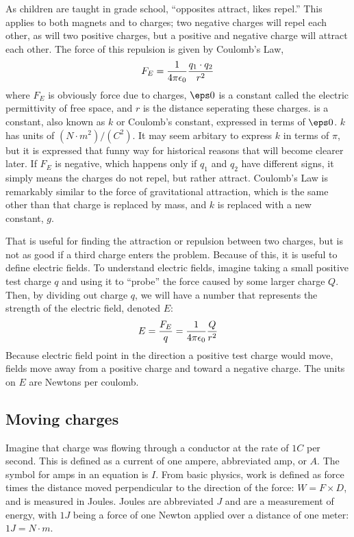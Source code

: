 \documentclass[12pt]{article}
\begin{document}
As children are taught in grade school, ``opposites attract, likes repel.'' This applies to both magnets and to charges; two negative charges will repel each other, as will two positive charges, but a positive and negative charge will attract each other. The force of this repulsion is given by Coulomb's Law,
\begin{equation}
\displaystyle F_E = \displaystyle \frac{1}{4\pi \epsilon _0} \frac{q_1\cdot q_2}{r^2}
\end{equation}
where $F_E$ is obviously force due to charges, $\eps0$ is a constant called the electric permittivity of free space, and $r$ is the distance seperating these charges. \kei is a constant, also known as $k$ or Coulomb's constant, expressed in terms of $\eps0$. $k$ has units of $\left(N\cdot m^2\right)/\left(C^2\right)$. It may seem arbitary to express $k$ in terms of $\pi$, but it is expressed that funny way for historical reasons that will become clearer later. If $F_E$ is negative, which happens only if $q_1$ and $q_2$ have different signs, it simply means the charges do not repel, but rather attract. Coulomb's Law is remarkably similar to the force of gravitational attraction, which is the same other than that charge is replaced by mass, and $k$ is replaced with a new constant, $g$.

That is useful for finding the attraction or repulsion between two charges, but is not as good if a third charge enters the problem. Because of this, it is useful to define electric fields. To understand electric fields, imagine taking a small positive test charge $q$ and using it to ``probe'' the force caused by some larger charge $Q$. Then, by dividing out charge $q$, we will have a number that represents the strength of the electric field, denoted $E$:
\begin{equation}
\displaystyle E = \frac{F_E}{q} = \displaystyle \frac{1}{4\pi \epsilon _0} \frac{Q}{r^2}
\end{equation}
Because electric field point in the direction a positive test charge would move, fields move away from a positive charge and toward a negative charge. The units on $E$ are Newtons per coulomb.

\subsection{Moving charges}

\indent Imagine that charge was flowing through a conductor at the rate of $1C$ per second. This is defined as a current of one ampere, abbreviated amp, or $A$. The symbol for amps in an equation is $I$. From basic physics, work is defined as force times the distance moved perpendicular to the direction of the force: $W=F\times D$, and is measured in Joules. Joules are abbreviated $J$ and are a measurement of energy, with $1J$ being a force of one Newton applied over a distance of one meter: $1J=N\cdot m$. 
\end{document}
